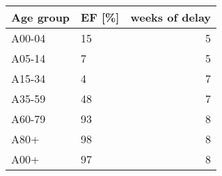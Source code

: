 \begin{tabular}{llr}
\toprule
Age group & EF [\%] & weeks of delay \\
\midrule
A00-04 & 15 & 5 \\
A05-14 & 7 & 5 \\
A15-34 & 4 & 7 \\
A35-59 & 48 & 7 \\
A60-79 & 93 & 8 \\
A80+ & 98 & 8 \\
A00+ & 97 & 8 \\
\bottomrule
\end{tabular}
